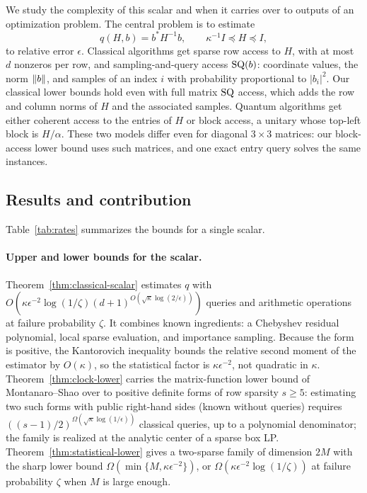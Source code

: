 We study the complexity of this scalar and when it carries over to
outputs of an optimization problem. The central problem is to estimate
\[
 q(H,b)=b^*H^{-1}b,\qquad \kappa^{-1}I\preceq H\preceq I,
\]
to relative error $\epsilon$. Classical algorithms get sparse row
access to $H$, with at most $d$ nonzeros per row, and sampling-and-query
access $\mathrm{SQ}(b)$: coordinate values, the norm $\left\lVert b\right\rVert$, and samples of
an index $i$ with probability proportional to $|b_i|^2$. Our classical
lower bounds hold even with full matrix $\mathrm{SQ}$ access, which adds the row
and column norms of $H$ and the associated samples. Quantum algorithms
get either coherent access to the entries of $H$ or block access, a
unitary whose top-left block is $H/\alpha$. These two models differ even
for diagonal $3\times3$ matrices: our block-access lower bound uses such
matrices, and one exact entry query solves the same instances.

\subsection{Results and contribution}
Table~\ref{tab:rates} summarizes the bounds for a single scalar.

\paragraph{Upper and lower bounds for the scalar.}
Theorem~\ref{thm:classical-scalar} estimates $q$ with
$O(\kappa\epsilon^{-2}\log(1/\zeta)(d+1)^{O(\sqrt\kappa\log(2/\epsilon))})$
queries and arithmetic operations at failure probability $\zeta$. It
combines known ingredients: a Chebyshev residual polynomial, local sparse
evaluation, and importance sampling. Because the form is positive, the
Kantorovich inequality bounds the relative second moment of the estimator
by $O(\kappa)$, so the statistical factor is $\kappa\epsilon^{-2}$, not
quadratic in $\kappa$. Theorem~\ref{thm:clock-lower} carries the
matrix-function lower bound of Montanaro--Shao over to positive definite
forms of row sparsity $s\geq5$: estimating two such forms with public
right-hand sides (known without queries) requires
$((s-1)/2)^{\Omega(\sqrt\kappa\log(1/\epsilon))}$ classical queries, up
to a polynomial denominator; the family is realized at the analytic center of a sparse box LP.
Theorem~\ref{thm:statistical-lower} gives a two-sparse family of
dimension $2M$ with the sharp lower bound
$\Omega(\min\{M,\kappa\epsilon^{-2}\})$, or
$\Omega(\kappa\epsilon^{-2}\log(1/\zeta))$ at failure probability
$\zeta$ when $M$ is large enough.

